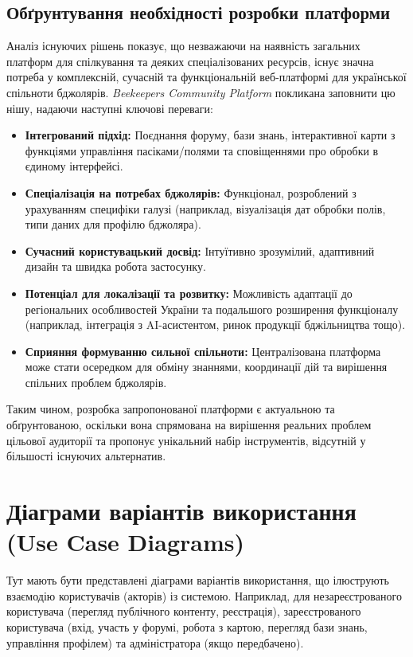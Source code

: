 \subsection{Обґрунтування необхідності розробки платформи}
Аналіз існуючих рішень показує, що незважаючи на наявність загальних платформ для спілкування та деяких спеціалізованих ресурсів, існує значна потреба у комплексній, сучасній та функціональній веб-платформі для української спільноти бджолярів. \textit{Beekeepers Community Platform} покликана заповнити цю нішу, надаючи наступні ключові переваги:
\begin{itemize}
    \item \textbf{Інтегрований підхід:} Поєднання форуму, бази знань, інтерактивної карти з функціями управління пасіками/полями та сповіщеннями про обробки в єдиному інтерфейсі.
    \item \textbf{Спеціалізація на потребах бджолярів:} Функціонал, розроблений з урахуванням специфіки галузі (наприклад, візуалізація дат обробки полів, типи даних для профілю бджоляра).
    \item \textbf{Сучасний користувацький досвід:} Інтуїтивно зрозумілий, адаптивний дизайн та швидка робота застосунку.
    \item \textbf{Потенціал для локалізації та розвитку:} Можливість адаптації до регіональних особливостей України та подальшого розширення функціоналу (наприклад, інтеграція з AI-асистентом, ринок продукції бджільництва тощо).
    \item \textbf{Сприяння формуванню сильної спільноти:} Централізована платформа може стати осередком для обміну знаннями, координації дій та вирішення спільних проблем бджолярів.
\end{itemize}
Таким чином, розробка запропонованої платформи є актуальною та обґрунтованою, оскільки вона спрямована на вирішення реальних проблем цільової аудиторії та пропонує унікальний набір інструментів, відсутній у більшості існуючих альтернатив.

\section{Діаграми варіантів використання (Use Case Diagrams)}
\label{sec:use_cases}
Тут мають бути представлені діаграми варіантів використання, що ілюструють взаємодію користувачів (акторів) із системою. Наприклад, для незареєстрованого користувача (перегляд публічного контенту, реєстрація), зареєстрованого користувача (вхід, участь у форумі, робота з картою, перегляд бази знань, управління профілем) та адміністратора (якщо передбачено).

